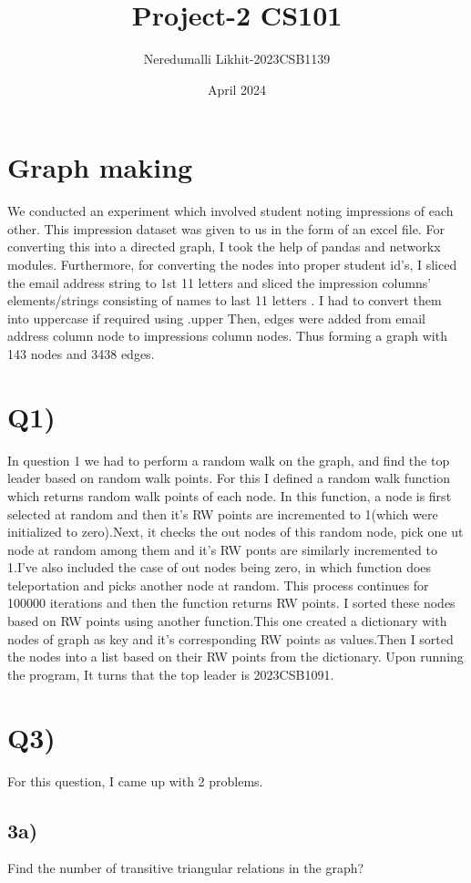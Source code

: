 \documentclass{article}
\title{Project-2  CS101}
\author{Neredumalli Likhit-2023CSB1139}
\date{April 2024}
\begin{document}
\maketitle

\section*{Graph making}
We conducted an experiment which involved student noting impressions of each other. This impression dataset was given to us in the form of an excel file.
For  converting this into a directed graph, I took the help of  pandas and networkx modules. Furthermore, for converting the nodes into proper student id's, I sliced the email address string to 1st 11 letters and sliced the impression columns' elements/strings consisting of names to last 11 letters . I had to convert them into uppercase if required using .upper
Then, edges were added from email address column node to impressions column nodes. Thus forming a graph with 143 nodes and 3438 edges.
\section*{Q1)}
In question 1 we had to perform a random walk on the graph, and find the top leader based on random walk points.
For this I defined a random walk function which returns random walk points of each node. In this function,  a node is first selected at random and then it's RW points are incremented to 1(which were initialized to zero).Next, it checks the out nodes of this random node, pick one ut node at random among them and it's RW ponts are similarly incremented to 1.I've also included the case of out nodes being zero, in which function does teleportation and picks another node at random.
This process continues for 100000 iterations and then the function returns RW points.
I sorted these nodes based on RW points using another function.This one created a dictionary with nodes of graph as key and it's corresponding RW points as values.Then I sorted the nodes into a list based on their RW points from the dictionary.
Upon running the program, It turns that the top leader is 2023CSB1091.

\section*{Q3)}
For this question, I came up with 2 problems.
\subsection*{3a)}
Find the number of transitive triangular relations in the graph?
\end{document}
